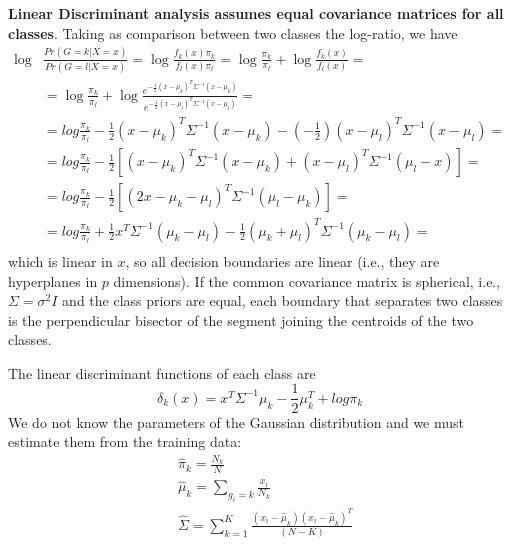 \documentclass[12pt, letterpaper]{article}
\theoremstyle{definition}
\begin{document}
\textbf{Linear Discriminant analysis assumes equal covariance matrices for all classes}. Taking as comparison between two classes the log-ratio, we have
\begin{equation}
\begin{aligned}
\log &\frac{Pr(G=k|X=x)}{Pr(G=l|X=x)} = \log \frac{f_k(x) \pi_k}{f_l(x) \pi_l} = \log \frac{ \pi_k}{ \pi_l} + \log\frac{f_k(x)}{f_l(x) } =\\
&= \log \frac{ \pi_k}{ \pi_l} + \log\frac{e^{-\frac{1}{2}\left( x-\mu_k\right)^T\Sigma^{-1}\left( x-\mu_k\right)}}{e^{-\frac{1}{2}\left( x-\mu_l\right)^T\Sigma^{-1}\left( x-\mu_l\right)} }   =  \\
&=log \frac{ \pi_k}{ \pi_l} - \frac{1}{2}\left( x-\mu_k\right)^T\Sigma^{-1}\left( x-\mu_k\right) - \left( -\frac{1}{2}\right)\left( x-\mu_l\right)^T\Sigma^{-1}\left( x-\mu_l\right) =\\
&= log \frac{ \pi_k}{ \pi_l} - \frac{1}{2}\left[\left( x-\mu_k\right)^T\Sigma^{-1}\left( x-\mu_k\right) + \left( x-\mu_l\right)^T\Sigma^{-1}\left( \mu_l - x\right)\right] =\\
&= log \frac{ \pi_k}{ \pi_l} - \frac{1}{2}\left[\left( 2x-\mu_k-\mu_l\right)^T\Sigma^{-1}\left( \mu_l-\mu_k\right) \right] =\\
&= log \frac{ \pi_k}{ \pi_l} +\frac{1}{2}x^T\Sigma^{-1}\left( \mu_k-\mu_l\right)- \frac{1}{2}\left( \mu_k+\mu_l\right)^T\Sigma^{-1}\left( \mu_k-\mu_l\right) =\\
\end{aligned}
\end{equation}
which is linear in $x$, so all decision boundaries are linear (i.e., they are hyperplanes in $p$ dimensions). If the common covariance matrix is spherical, i.e., $\Sigma=\sigma^2 I$ and the class priors are equal, each boundary that separates two classes is the perpendicular bisector of the segment joining the centroids of the two classes.

The linear discriminant functions of each class are 
\begin{equation}
\delta_k(x)  = x^T \Sigma^{-1}\mu_k -\frac{1}{2}\mu_k^T+log\pi_k
\end{equation}
We do not know the parameters of the Gaussian distribution and we must estimate them from the training data:
\begin{align}
&\hat{\pi}_k = \frac{N_k}{N}\\
&\hat{\mu}_k = \sum_{g_i=k}\frac{x_i}{N_k}\\
&\hat{\Sigma} = \sum_{k=1}^K\frac{(x_i-\hat{\mu}_k)(x_i-\hat{\mu}_k)^T}{(N-K)}
\end{align}
\end{document}
